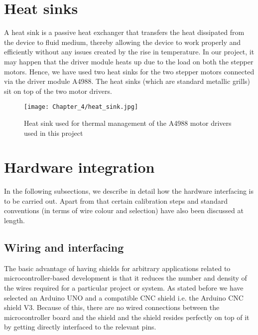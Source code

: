 \section{Heat sinks}

A heat sink is a passive heat exchanger that transfers the heat dissipated from the device to fluid medium, thereby allowing the device to work properly and efficiently without any issues created by the rise in temperature. In our project, it may happen that the driver module heats up due to the load on both the stepper motors. Hence, we have used two heat sinks for the two stepper motors connected via the driver module A4988. The heat sinks (which are standard metallic grills) sit on top of the two motor drivers.

\begin{figure}[h]
 \centering
 \texttt{[image: Chapter\_4/heat\_sink.jpg]}
 \caption{Heat sink used for thermal management of the A4988 motor drivers used in this project}
 \label{fig:sink}
\end{figure}


\section{Hardware integration}

In the following subsections, we describe in detail how the hardware interfacing is to be carried out. Apart from that certain calibration steps and standard conventions (in terms of wire colour and selection) have also been discussed at length.

\subsection{Wiring and interfacing} \label{winterface}

The basic advantage of having shields for arbitrary applications related to microcontroller-based development is that it reduces the number and density of the wires required for a particular project or system. As stated before we have selected an Arduino UNO and a compatible CNC shield i.e. the Arduino CNC shield V3. Because of this, there are no wired connections between the microcontroller board and the shield and the shield resides perfectly on top of it by getting directly interfaced to the relevant pins. \par

